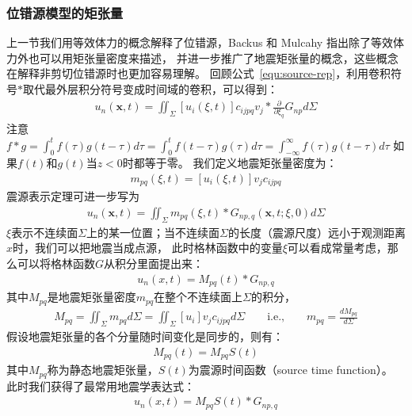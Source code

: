 \subsubsection{位错源模型的矩张量}
上一节我们用等效体力的概念解释了位错源，Backus 和 Mulcahy \citep{Backus1976a} 指出除了等效体力外也可以用矩张量密度来描述，
并进一步推广了地震矩张量的概念，这些概念在解释非剪切位错源时也更加容易理解。
回顾公式~\ref{equ:source-rep}，利用卷积符号$\ast$取代最外层积分符号变成时间域的卷积，可以得到：
\begin{align}
    u_{n}(\mathbf{x}, t)= \iint\nolimits_{\Sigma}  [u_{i}(\xi ,t)] c_{i j p q} v_{j} \ast \frac{\partial}{\partial {\xi_q}} G_{np}  d \Sigma 
   \label{equ:source-rep-m}
\end{align}
注意$f \ast g = \int\nolimits_0^t f(\tau)g(t-\tau) d\tau = \int\nolimits_0^t f(t-\tau)g(\tau) d\tau = \int\nolimits_{-\infty}^{\infty} f(\tau)g(t-\tau) d\tau$
如果$f(t)$和$g(t)$当$z<0$时都等于零。
我们定义地震矩张量密度为：
\begin{align}
    m_{pq}(\xi ,t)=[u_i(\xi ,t)]v_j c_{ijpq}
    \label{equ:moment-density-tensor}
\end{align}
震源表示定理可进一步写为
\begin{align}
    u_{n}(\mathbf{x}, t)= \iint\nolimits_{\Sigma} m_{pq}(\xi ,t) \ast  G_{np,q} (\mathbf{x}, t; \xi, 0) d \Sigma 
   \label{equ:source-rep-mdt}
\end{align}
$\xi$表示不连续面$\Sigma$上的某一位置；当不连续面$\Sigma$的长度（震源尺度）远小于观测距离$x$时，我们可以把地震当成点源，
此时格林函数中的变量$\xi$可以看成常量考虑，那么可以将格林函数$G$从积分里面提出来：
\begin{align}
    u_n(x,t)=M_{pq}(t)*G_{np,q}
    \label{equ:U-M*G}
\end{align}
其中$M_{pq}$是地震矩张量密度$m_{pq}$在整个不连续面上$\Sigma$的积分，
\begin{align}
    M_{pq} = \iint\nolimits_{\Sigma} m_{pq} d{\Sigma} 
    = \iint\nolimits_{\Sigma} [u_i]v_j c_{ijpq} d{\Sigma}
    \qquad \text{i.e.,} \qquad
    m_{pq}=\frac{dM_{pq}}{d\Sigma}
    \label{equ:M-m}
\end{align}
假设地震矩张量的各个分量随时间变化是同步的，则有：
\begin{align}
    M_{pq}(t)=M_{pq}S(t)
    \label{equ:s-t-f}
\end{align}
其中$M_{pq}$称为静态地震矩张量，$S(t)$为震源时间函数（source time function）。
此时我们获得了最常用地震学表达式：
\begin{align}
    u_n(x,t)=M_{pq}S(t)*G_{np,q}
    \label{equ:U-MS*G}
\end{align}

